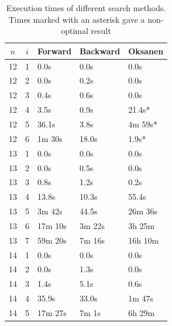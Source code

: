 \documentclass[twoside,leqno,twocolumn]{article}
\begin{document}
\begin{table}[!t]
  \renewcommand{\arraystretch}{1.1}
  \caption{Execution times of different search methods. Times marked with an asterisk gave a non-optimal result }
  \label{table:search_algorithms}
  \centering
  \small
  \begin{tabular}{c|c|l|l|l}
    $n$ & $i$ & \textbf{Forward} & \textbf{Backward} & \textbf{Oksanen} \\
    \hline
    12  & 1   & 0.0s             & 0.0s              & 0.0s             \\
    12  & 2   & 0.0s             & 0.2s              & 0.0s             \\
    12  & 3   & 0.4s             & 0.6s              & 0.0s             \\
    12  & 4   & 3.5s             & 0.9s              & 21.4s*           \\
    12  & 5   & 36.1s            & 3.8s              & 4m 59s*          \\
    12  & 6   & 1m 30s           & 18.0s             & 1.9s*            \\
    \hline
    13  & 1   & 0.0s             & 0.0s              & 0.0s             \\
    13  & 2   & 0.0s             & 0.5s              & 0.0s             \\
    13  & 3   & 0.8s             & 1.2s              & 0.2s             \\
    13  & 4   & 13.8s            & 10.3s             & 55.4s            \\
    13  & 5   & 3m 42s           & 44.5s             & 26m 36s          \\
    13  & 6   & 17m 10s          & 3m 22s            & 3h 25m           \\
    13  & 7   & 59m 20s          & 7m 16s            & 16h 10m          \\
    \hline
    14  & 1   & 0.0s             & 0.0s              & 0.0s             \\
    14  & 2   & 0.0s             & 1.3s              & 0.0s             \\
    14  & 3   & 1.4s             & 5.1s              & 0.6s             \\
    14  & 4   & 35.9s            & 33.0s             & 1m 47s           \\
    14  & 5   & 17m 27s          & 7m 1s             & 6h 29m           \\

\end{tabular}
\end{table}
\end{document}
